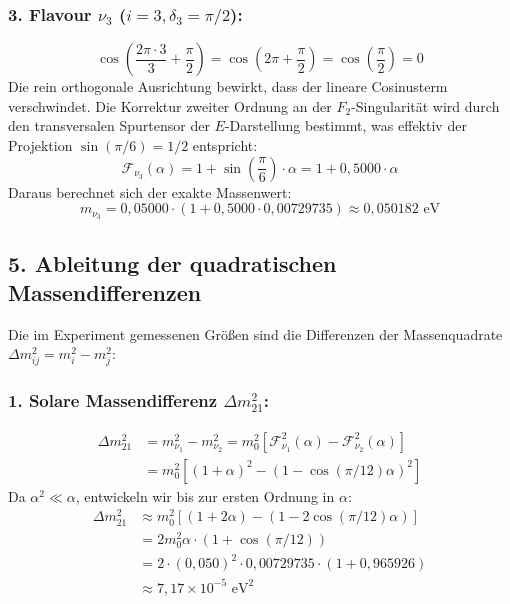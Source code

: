 \documentclass[11pt,a4paper]{article}
\begin{document}
	\subsubsection{3. Flavour \texorpdfstring{$\nu_3$}{nu\_3} (\texorpdfstring{$i=3, \delta_3 = \pi/2$}{i=3, delta\_3=pi/2}):}
	\begin{equation}
		\cos\left(\frac{2\pi \cdot 3}{3} + \frac{\pi}{2}\right) = \cos\left(2\pi + \frac{\pi}{2}\right) = \cos\left(\frac{\pi}{2}\right) = 0
	\end{equation}
	Die rein orthogonale Ausrichtung bewirkt, dass der lineare Cosinusterm verschwindet. Die Korrektur zweiter Ordnung an der $F_2$-Singularität wird durch den transversalen Spurtensor der $E$-Darstellung bestimmt, was effektiv der Projektion $\sin(\pi/6) = 1/2$ entspricht:
	\begin{equation}
		\mathcal{F}_{\nu_3}(\alpha) = 1 + \sin\left(\frac{\pi}{6}\right) \cdot \alpha = 1 + 0{,}5000 \cdot \alpha
	\end{equation}
	Daraus berechnet sich der exakte Massenwert:
	\begin{equation}
		m_{\nu_3} = 0{,}05000 \cdot (1 + 0{,}5000 \cdot 0{,}00729735) \approx 0{,}050182\text{ eV}
	\end{equation}
	
	\subsection{5. Ableitung der quadratischen Massendifferenzen}
	
	Die im Experiment gemessenen Größen sind die Differenzen der Massenquadrate $\Delta m_{ij}^2 = m_i^2 - m_j^2$:
	
	\subsubsection{1. Solare Massendifferenz \texorpdfstring{$\Delta m_{21}^2$}{Delta m\_21\^{}2}:}
	\begin{align}
		\Delta m_{21}^2 &= m_{\nu_1}^2 - m_{\nu_2}^2 = m_0^2 \left[ \mathcal{F}_{\nu_1}^2(\alpha) - \mathcal{F}_{\nu_2}^2(\alpha) \right] \\
		&= m_0^2 \left[ (1 + \alpha)^2 - \left(1 - \cos(\pi/12)\alpha\right)^2 \right]
	\end{align}
	Da $\alpha^2 \ll \alpha$, entwickeln wir bis zur ersten Ordnung in $\alpha$:
	\begin{align}
		\Delta m_{21}^2 &\approx m_0^2 \left[ (1 + 2\alpha) - (1 - 2\cos(\pi/12)\alpha) \right] \\
		&= 2 m_0^2 \alpha \cdot \left( 1 + \cos(\pi/12) \right) \\
		&= 2 \cdot (0{,}050)^2 \cdot 0{,}00729735 \cdot (1 + 0{,}965926) \\
		&\approx 7{,}17 \times 10^{-5}\text{ eV}^2
	\end{align}
	
\end{document}
